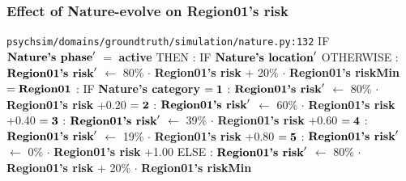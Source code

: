 \documentclass{article}%
\begin{document}
%
\subsubsection{Effect of Nature{-}evolve on Region01's risk}%
\label{ssubsec:Effect of Nature{-}evolve on Region01's risk}%
\begin{flushleft}%
\verb|psychsim/domains/groundtruth/simulation/nature.py:132|%
\linebreak%
IF %
$\mbox{\textbf{Nature's phase}} '$%
$=$%
\textbf{active}%
\linebreak%
\hspace*{2em}%
THEN %
: %
IF %
$\mbox{\textbf{Nature's location}} '$%
\linebreak%
\hspace*{4em}%
OTHERWISE %
: %
$\mbox{\textbf{Region01's risk}} '$%
$\leftarrow$%
80\%%
$\cdot$%
\textbf{Region01's risk}%
+%
20\%%
$\cdot$%
\textbf{Region01's riskMin}%
\linebreak%
\hspace*{4em}%
$= \mbox{\textbf{Region01}}$%
: %
IF %
\textbf{Nature's category}%
\linebreak%
\hspace*{6em}%
$= \mbox{\textbf{1}}$%
: %
$\mbox{\textbf{Region01's risk}} '$%
$\leftarrow$%
80\%%
$\cdot$%
\textbf{Region01's risk}%
+0.20%
\linebreak%
\hspace*{6em}%
$= \mbox{\textbf{2}}$%
: %
$\mbox{\textbf{Region01's risk}} '$%
$\leftarrow$%
60\%%
$\cdot$%
\textbf{Region01's risk}%
+0.40%
\linebreak%
\hspace*{6em}%
$= \mbox{\textbf{3}}$%
: %
$\mbox{\textbf{Region01's risk}} '$%
$\leftarrow$%
39\%%
$\cdot$%
\textbf{Region01's risk}%
+0.60%
\linebreak%
\hspace*{6em}%
$= \mbox{\textbf{4}}$%
: %
$\mbox{\textbf{Region01's risk}} '$%
$\leftarrow$%
19\%%
$\cdot$%
\textbf{Region01's risk}%
+0.80%
\linebreak%
\hspace*{6em}%
$= \mbox{\textbf{5}}$%
: %
$\mbox{\textbf{Region01's risk}} '$%
$\leftarrow$%
0\%%
$\cdot$%
\textbf{Region01's risk}%
+1.00%
\linebreak%
\hspace*{2em}%
ELSE %
: %
$\mbox{\textbf{Region01's risk}} '$%
$\leftarrow$%
80\%%
$\cdot$%
\textbf{Region01's risk}%
+%
20\%%
$\cdot$%
\textbf{Region01's riskMin}%
\end{flushleft}
\end{document}

